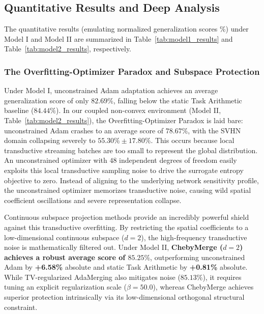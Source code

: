 \subsection{Quantitative Results and Deep Analysis}
The quantitative results (emulating normalized generalization scores \%) under Model I and Model II are summarized in Table~\ref{tab:model1_results} and Table~\ref{tab:model2_results}, respectively.

\subsubsection{The Overfitting-Optimizer Paradox and Subspace Protection}
Under Model I, unconstrained Adam adaptation achieves an average generalization score of only $82.69\%$, falling below the static Task Arithmetic baseline ($84.44\%$). In our coupled non-convex environment (Model II, Table~\ref{tab:model2_results}), the Overfitting-Optimizer Paradox is laid bare: unconstrained Adam crashes to an average score of $78.67\%$, with the SVHN domain collapsing severely to $55.30\% \pm 17.80\%$. This occurs because local transductive streaming batches are too small to represent the global distribution. An unconstrained optimizer with $48$ independent degrees of freedom easily exploits this local transductive sampling noise to drive the surrogate entropy objective to zero. Instead of aligning to the underlying network sensitivity profile, the unconstrained optimizer memorizes transductive noise, causing wild spatial coefficient oscillations and severe representation collapse.

Continuous subspace projection methods provide an incredibly powerful shield against this transductive overfitting. By restricting the spatial coefficients to a low-dimensional continuous subspace ($d=2$), the high-frequency transductive noise is mathematically filtered out. Under Model II, \textbf{ChebyMerge ($d=2$) achieves a robust average score of $85.25\%$}, outperforming unconstrained Adam by \textbf{+6.58\%} absolute and static Task Arithmetic by \textbf{+0.81\%} absolute. While TV-regularized AdaMerging also mitigates noise ($85.13\%$), it requires tuning an explicit regularization scale ($\beta=50.0$), whereas ChebyMerge achieves superior protection intrinsically via its low-dimensional orthogonal structural constraint.

